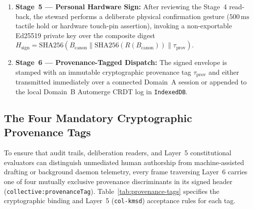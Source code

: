 \begin{enumerate}
  \item \textbf{Stage~5 --- Personal Hardware Sign:} After reviewing the Stage~4 read-back, the steward performs a deliberate physical confirmation gesture ($500\,\mathrm{ms}$ tactile hold or hardware touch-pin assertion), invoking a non-exportable Ed25519 private key over the composite digest $H_{\mathrm{sign}} = \mathrm{SHA256}(B_{\mathrm{canon}} \parallel \mathrm{SHA256}(R(B_{\mathrm{canon}})) \parallel \tau_{\mathrm{prov}})$.
  \item \textbf{Stage~6 --- Provenance-Tagged Dispatch:} The signed envelope is stamped with an immutable cryptographic provenance tag $\tau_{\mathrm{prov}}$ and either transmitted immediately over a connected Domain~A session or appended to the local Domain~B Automerge CRDT log in \texttt{IndexedDB}.
\end{enumerate}

\subsection{The Four Mandatory Cryptographic Provenance Tags}
\label{subsec:provenance-tags}

To ensure that audit trails, deliberation readers, and Layer~5 constitutional evaluators can distinguish unmediated human authorship from machine-assisted drafting or background daemon telemetry, every frame traversing Layer~6 carries one of four mutually exclusive provenance discriminants in its signed header (\texttt{collective:provenanceTag}). Table~\ref{tab:provenance-tags} specifies the cryptographic binding and Layer~5 (\texttt{col-kmsd}) acceptance rules for each tag.

